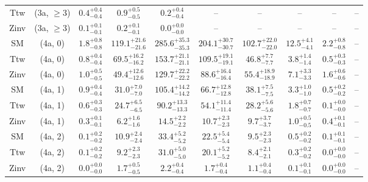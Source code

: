 \begin{table}[h!]
{\begin{tabular}{cccccccccc}
	Ttw & (3a, $\ge3$) & $0.4^{+ 0.4 }_{- 0.4 }$ & $0.9^{+ 0.5 }_{- 0.5 }$ & $0.2^{+ 0.4 }_{- 0.4 }$ & -- & -- & -- & -- & -- \\[0.5ex] 
	Zinv & (3a, $\ge3$) & $0.1^{+ 0.1 }_{- 0.1 }$ & $0.2^{+ 0.1 }_{- 0.1 }$ & $0.0^{+ 0.0 }_{- 0.0 }$ & -- & -- & -- & -- & -- \\[0.5ex] 
	SM & (4a, 0) & $1.8^{+ 0.8 }_{- 0.8 }$ & $119.1^{+ 21.6 }_{- 21.6 }$ & $285.6^{+ 35.3 }_{- 35.3 }$ & $204.1^{+ 30.7 }_{- 30.7 }$ & $102.7^{+ 22.0 }_{- 22.0 }$ & $12.5^{+ 4.1 }_{- 4.1 }$ & $2.2^{+ 0.8 }_{- 0.8 }$ & -- \\[0.5ex] 
	Ttw & (4a, 0) & $0.8^{+ 0.4 }_{- 0.4 }$ & $69.5^{+ 16.2 }_{- 16.2 }$ & $153.7^{+ 21.1 }_{- 21.1 }$ & $109.5^{+ 19.1 }_{- 19.1 }$ & $46.8^{+ 7.7 }_{- 7.7 }$ & $3.8^{+ 1.4 }_{- 1.4 }$ & $0.5^{+ 0.3 }_{- 0.3 }$ & -- \\[0.5ex] 
	Zinv & (4a, 0) & $1.0^{+ 0.5 }_{- 0.5 }$ & $49.4^{+ 12.6 }_{- 12.6 }$ & $129.7^{+ 22.2 }_{- 22.2 }$ & $88.6^{+ 16.4 }_{- 16.4 }$ & $55.4^{+ 18.9 }_{- 18.9 }$ & $7.1^{+ 3.3 }_{- 3.3 }$ & $1.6^{+ 0.6 }_{- 0.6 }$ & -- \\[0.5ex] 
	SM & (4a, 1) & $0.9^{+ 0.4 }_{- 0.4 }$ & $31.0^{+ 7.0 }_{- 7.0 }$ & $105.4^{+ 14.2 }_{- 14.2 }$ & $66.7^{+ 12.8 }_{- 12.8 }$ & $38.1^{+ 7.5 }_{- 7.5 }$ & $3.3^{+ 1.0 }_{- 1.0 }$ & $0.5^{+ 0.2 }_{- 0.2 }$ & -- \\[0.5ex] 
	Ttw & (4a, 1) & $0.6^{+ 0.3 }_{- 0.3 }$ & $24.7^{+ 6.5 }_{- 6.5 }$ & $90.2^{+ 13.3 }_{- 13.3 }$ & $54.1^{+ 11.4 }_{- 11.4 }$ & $28.2^{+ 5.6 }_{- 5.6 }$ & $1.8^{+ 0.7 }_{- 0.7 }$ & $0.1^{+ 0.0 }_{- 0.0 }$ & -- \\[0.5ex] 
	Zinv & (4a, 1) & $0.3^{+ 0.1 }_{- 0.1 }$ & $6.2^{+ 1.6 }_{- 1.6 }$ & $14.5^{+ 2.2 }_{- 2.2 }$ & $10.7^{+ 2.3 }_{- 2.3 }$ & $9.7^{+ 3.7 }_{- 3.7 }$ & $1.0^{+ 0.5 }_{- 0.5 }$ & $0.4^{+ 0.1 }_{- 0.1 }$ & -- \\[0.5ex] 
	SM & (4a, 2) & $0.1^{+ 0.2 }_{- 0.2 }$ & $10.9^{+ 2.4 }_{- 2.4 }$ & $33.4^{+ 5.2 }_{- 5.2 }$ & $22.5^{+ 5.4 }_{- 5.4 }$ & $9.5^{+ 2.3 }_{- 2.3 }$ & $0.5^{+ 0.2 }_{- 0.2 }$ & $0.1^{+ 0.1 }_{- 0.1 }$ & -- \\[0.5ex] 
	Ttw & (4a, 2) & $0.1^{+ 0.2 }_{- 0.2 }$ & $9.2^{+ 2.3 }_{- 2.3 }$ & $31.0^{+ 5.0 }_{- 5.0 }$ & $20.1^{+ 5.2 }_{- 5.2 }$ & $8.4^{+ 2.1 }_{- 2.1 }$ & $0.3^{+ 0.2 }_{- 0.2 }$ & $0.0^{+ 0.0 }_{- 0.0 }$ & -- \\[0.5ex] 
	Zinv & (4a, 2) & $0.0^{+ 0.0 }_{- 0.0 }$ & $1.7^{+ 0.5 }_{- 0.5 }$ & $2.2^{+ 0.4 }_{- 0.4 }$ & $1.7^{+ 0.4 }_{- 0.4 }$ & $1.1^{+ 0.4 }_{- 0.4 }$ & $0.1^{+ 0.1 }_{- 0.1 }$ & $0.0^{+ 0.0 }_{- 0.0 }$ & -- \\[0.5ex] 

\end{tabular}}
\end{table}
